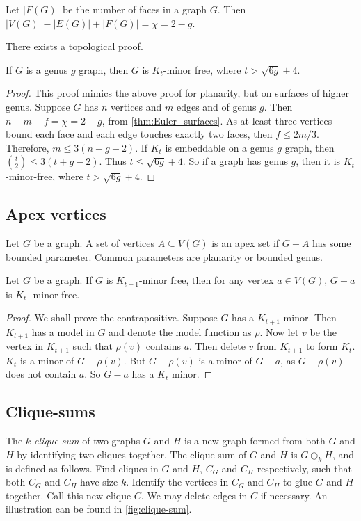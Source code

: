 \begin{theorem}\label{thm:Euler_surfaces}
	Let \(|F(G)|\) be the number of faces in a graph \(G\). Then \(|V(G)| - |E(G)| + |F(G)| = \chi = 2 - g\). 
\end{theorem}
There exists a topological proof. 

\begin{theorem}\label{thm:bounded_genus_kt_free}
	If \(G\) is a genus \(g\) graph, then \(G\) is \(K_t\)-minor free, where \(t > \sqrt{6g} + 4\). 
\end{theorem}
\begin{proof}
	This proof mimics the above proof for planarity, but on surfaces of higher genus. 
	Suppose \(G\) has \(n\) vertices and \(m\) edges and of genus $g$. Then \(n - m + f = \chi = 2-g\), from \cref{thm:Euler_surfaces}. As at least three vertices bound each face and each edge touches exactly two faces, then \(f \leq 2m/3\). Therefore, \(m \leq 3(n + g - 2)\). If \(K_t\) is embeddable on a genus \(g\) graph, then \(\binom{t}{2} \leq 3 (t + g - 2)\). Thus \(t \leq \sqrt{6g} + 4\). So if a graph has genus \(g\), then it is \(K_t\)-minor-free, where \(t > \sqrt{6g} + 4\). 
\end{proof}

\subsection{Apex vertices}\label{sssec:Apex_Vertices}
Let $G$ be a graph. A set of vertices $A \subseteq V(G)$ is an apex set if $G - A$ has some bounded parameter. Common parameters are planarity or bounded genus. 
\begin{theorem}
	Let $G$ be a graph. If \(G\) is \(K_{t + 1}\)-minor free, then for any vertex $a \in V(G)$, $G - a$ is \(K_t\)- minor free. 
\end{theorem}
\begin{proof}
	We shall prove the contrapositive. Suppose \(G\) has a \(K_{t + 1}\) minor. Then \(K_{t + 1}\) has a model in \(G\) and denote the model function as \(\rho\). Now let \(v\) be the vertex in \(K_{t + 1}\) such that \(\rho(v)\) contains \(a\). Then delete \(v\) from \(K_{t + 1}\) to form $K_t$. \(K_t\) is a minor of \(G - \rho(v)\). But \(G - \rho(v)\) is a minor of \(G - a\), as \(G - \rho(v)\) does not contain \(a\). So \(G - a\) has a \(K_t\) minor. 
\end{proof}
\subsection{Clique-sums}\label{sssec:Clique_Sums}
The \textit{\(k\)-clique-sum} of two graphs \(G\) and \(H\) is a new graph formed from both $G$ and $H$ by identifying two cliques together. The clique-sum of $G$ and $H$ is \(G \oplus_k H\), and is defined as follows. Find cliques in \(G\) and \(H\), \(C_G\) and \(C_H\) respectively, such that both \(C_G\) and \(C_H\) have size \(k\). Identify the vertices in \(C_G\) and \(C_H\) to glue \(G\) and \(H\) together. Call this new clique \(C\). We may delete edges in $C$ if necessary. An illustration can be found in \cref{fig:clique-sum}. 


